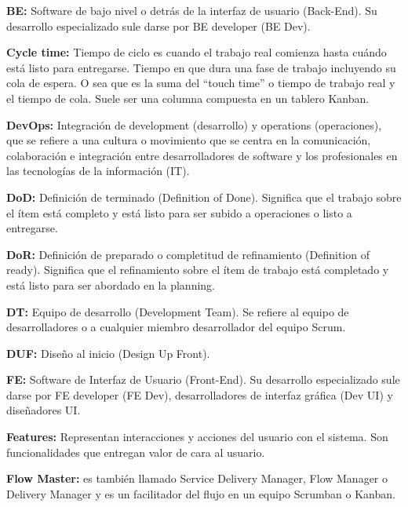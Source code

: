 \begin{description}
  \item {\textbf{BE:} Software de bajo nivel o detrás de la interfaz de usuario (Back-End). Su desarrollo especializado sule darse por BE developer (BE Dev).}
  
 \item {\textbf{Cycle time:} Tiempo de ciclo es cuando el trabajo real comienza hasta cuándo está listo para entregarse. Tiempo en que dura una fase de trabajo incluyendo su cola de espera. O sea que es la suma del “touch time” o tiempo de trabajo real y el tiempo de cola. Suele ser una columna compuesta en un tablero Kanban.}
  
 \item {\textbf{DevOps:} Integración de development (desarrollo) y operations (operaciones), que se refiere a una cultura o movimiento que se centra en la comunicación, colaboración e integración entre desarrolladores de software y los profesionales en las tecnologías de la información (IT).}
 
  \item {\textbf{DoD:} Definición de terminado (Definition of Done). Significa que el trabajo sobre el ítem está completo y está listo para ser subido a operaciones o listo a entregarse.}
  
  \item {\textbf{DoR:} Definición de preparado o completitud de refinamiento (Definition of ready). Significa que el refinamiento sobre el ítem de trabajo está completado y está listo para ser abordado en la planning.}
  
  \item {\textbf{DT:} Equipo de desarrollo (Development Team). Se refiere al equipo de desarrolladores o a cualquier miembro desarrollador del equipo Scrum.}
  
  \item {\textbf{DUF:} Diseño al inicio (Design Up Front).}

  \item {\textbf{FE:} Software de Interfaz de Usuario (Front-End). Su desarrollo especializado sule darse por FE developer (FE Dev), desarrolladores de interfaz gráfica (Dev UI) y diseñadores UI.}
  
  \item {\textbf{Features:} Representan interacciones y acciones del usuario con el sistema. Son funcionalidades que entregan valor de cara al usuario.}
  
  \item {\textbf{Flow Master:} es también llamado Service Delivery Manager, Flow Manager o Delivery Manager y es un facilitador del flujo en un equipo Scrumban o Kanban.}
    

\end{description}
